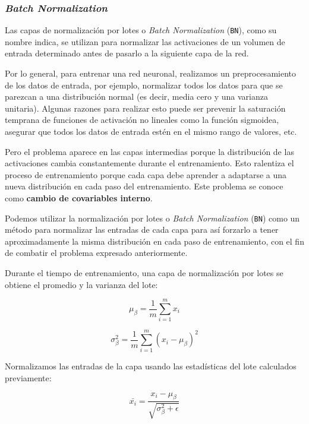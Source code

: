 \documentclass[a4paper,12pt]{article}
\begin{document}
\subsubsection{\textit{Batch Normalization}}

Las capas de normalización por lotes o \textit{Batch Normalization} (\texttt{BN}), como su nombre indica, se utilizan para normalizar las activaciones de un volumen de entrada determinado antes de pasarlo a la siguiente capa de la red.

\clearpage

Por lo general, para entrenar una red neuronal, realizamos un preprocesamiento de los datos de entrada, por ejemplo, normalizar todos los datos para que se parezcan a una distribución normal (es decir, media cero y una varianza unitaria). Algunas razones para realizar esto puede ser prevenir la saturación temprana de funciones de activación no lineales como la función sigmoidea, asegurar que todos los datos de entrada estén en el mismo rango de valores, etc. \citep{bn}

Pero el problema aparece en las capas intermedias porque la distribución de las activaciones cambia constantemente durante el entrenamiento. Esto ralentiza el proceso de entrenamiento porque cada capa debe aprender a adaptarse a una nueva distribución en cada paso del entrenamiento. Este problema se conoce como \textbf{cambio de covariables interno}.

Podemos utilizar la normalización por lotes o \textit{Batch Normalization} (\texttt{BN}) como un método para normalizar las entradas de cada capa para así forzarlo a tener aproximadamente la misma distribución en cada paso de entrenamiento, con el fin de combatir el problema expresado anteriormente.

Durante el tiempo de entrenamiento, una capa de normalización por lotes se obtiene el promedio y la varianza del lote:

$$ \mu_{\beta} = \frac{1}{m} \sum_{i=1}^m x_i $$

$$ \sigma_{\beta}^2 = \frac{1}{m}  \sum_{i=1}^m (x_i - \mu_{\beta} ) ^2$$

Normalizamos las entradas de la capa usando las estadísticas del lote calculados previamente:

$$ \bar{x_i} = \frac{x_i - \mu_{\beta}}{\sqrt{\sigma_{\beta}^2+\epsilon}} $$


\end{document}
